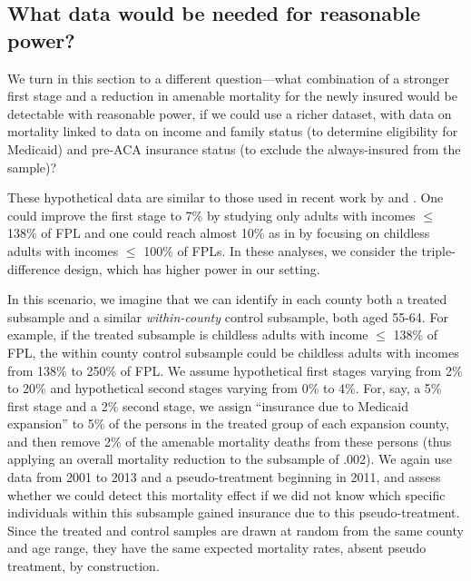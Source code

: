 \documentclass[12pt]{article}%
\begin{document}
\vspace{-.5cm}

\subsection{What data would be needed for reasonable power?}

We turn in this section to a different question---what combination of a stronger first stage and a reduction in amenable mortality for the newly insured would be detectable with reasonable power, if we could use a richer dataset, with data on mortality linked to data on income and family status (to determine eligibility for Medicaid) and pre-ACA insurance status (to exclude the always-insured from the sample)? 

These hypothetical data are similar to those used in recent work by \citet{millerMedicaidMortalityNew2019} and \citet{goldinHealthInsuranceMortality2021}. 
One could improve the first stage to 7\% by studying only adults with incomes $\leq$ 138\% of FPL and one could reach almost 10\% as in \citet{simonImpactHealthInsurance2017} by focusing on childless adults with incomes $\leq$  100\% of FPLs.  
In these analyses, we consider the triple-difference design, which has higher power in our setting.

In this scenario, we imagine that we can identify in each county both a treated subsample and a similar \emph{within-county} control subsample, both aged 55-64. 
For example, if the treated subsample is childless adults with income $\leq$ 138\% of FPL, the within county control subsample could be childless adults with incomes from 138\% to 250\% of FPL. 
We assume hypothetical first stages varying from 2\% to 20\% and hypothetical second stages varying from 0\% to 4\%. 
For, say, a 5\% first stage and a 2\% second stage, we assign ``insurance due to Medicaid expansion'' to 5\% of the persons in the treated group of each expansion county, and then remove 2\% of the amenable mortality deaths from these persons (thus applying an overall mortality reduction to the subsample of .002).  
We again use data from 2001 to 2013 and a pseudo-treatment beginning in 2011, and assess whether we could detect this mortality effect if we did not know which specific individuals within this subsample  gained insurance due to this pseudo-treatment.  
Since the treated and control samples are drawn at random from the same county and age range, they have the same expected mortality rates, absent pseudo treatment, by construction. 
\end{document}
